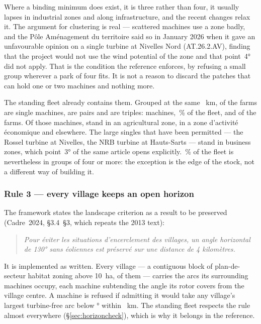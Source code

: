 \documentclass[11pt,a4paper]{article}
\begin{document}
Where a binding minimum does exist, it is three rather than four, it usually
lapses in industrial zones and along infrastructure, and the recent changes
relax it. The argument for clustering is real --- scattered machines use a zone
badly, and the Pôle Aménagement du territoire said so in January 2026 when it
gave an unfavourable opinion on a single turbine at Nivelles Nord
(AT.26.2.AV), finding that the project would not use the wind potential of the
zone and that point~4° did not apply. That is the condition the reference
enforces, by refusing a small group wherever a park of four fits. It is not a
reason to discard the patches that can hold one or two machines and nothing
more.

The standing fleet already contains them. Grouped at the same
\FleetFarmLink{}~km, \FleetFarmsOne{} of the \FleetFarms{} farms are single
machines, \FleetFarmsTwo{} are pairs and \FleetFarmsThree{} are triples:
\FleetInSmallFarms{} machines, \FleetInSmallFarmsPct{}\,\% of the fleet, and
\FleetFarmsSmall{} of the \FleetFarms{} farms. Of those machines,
\FleetSmallAgri{} stand in an agricultural zone, \FleetSmallZae{} in a zone
d'activité économique and \FleetSmallOther{} elsewhere. The large singles that
have been permitted --- the Rossel turbine at Nivelles, the NRB turbine at
Hauts-Sarts --- stand in business zones, which point~3° of the same article
opens explicitly. \FleetInBigFarms{}\,\% of the fleet is nevertheless in groups
of four or more: the exception is the edge of the stock, not a different way of
building it.

\subsubsection{Rule 3 --- every village keeps an open horizon}

The framework states the landscape criterion as a result to be preserved
(Cadre~2024, §3.4~§3, which repeats the 2013 text):

\begin{quote}\small\itshape
Pour éviter les situations d'encerclement des villages, un angle horizontal de
130° sans éoliennes est préservé sur une distance de 4 kilomètres.
\end{quote}

It is implemented as written. Every village --- a contiguous block of
plan-de-secteur habitat zoning above \SI{10}{\hectare}, \HorizonSettlements{} of
them --- carries the arcs its surrounding machines occupy, each machine
subtending the angle its rotor covers from the village centre. A machine is
refused if admitting it would take any village's largest turbine-free arc below
\PlaceAzimuth{}° within \PlaceHorizonRadius{}~km. The standing fleet respects
the rule almost everywhere (§\ref{sec:horizoncheck}), which is why it belongs in
the reference.
\end{document}
